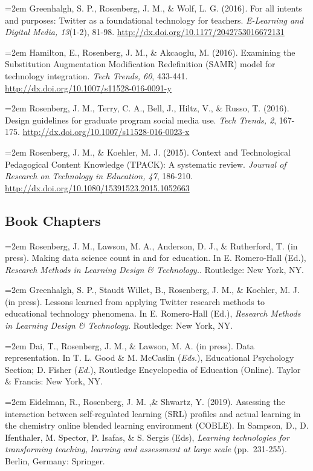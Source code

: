 \documentclass[
  11pt,
]{article}
\begin{document}
\hangindent=2em Greenhalgh, S. P., Rosenberg, J. M., \& Wolf, L. G.
(2016). For all intents and purposes: Twitter as a foundational
technology for teachers. \emph{E-Learning and Digital Media, 13}(1-2),
81-98. \url{http://dx.doi.org/10.1177/2042753016672131}

\hangindent=2em Hamilton, E., Rosenberg, J. M., \& Akcaoglu, M. (2016).
Examining the Substitution Augmentation Modification Redefinition (SAMR)
model for technology integration. \emph{Tech Trends, 60}, 433-441.
\url{http://dx.doi.org/10.1007/s11528-016-0091-y}

\hangindent=2em Rosenberg, J. M., Terry, C. A., Bell, J., Hiltz, V., \&
Russo, T. (2016). Design guidelines for graduate program social media
use. \emph{Tech Trends, 2}, 167-175.
\url{http://dx.doi.org/10.1007/s11528-016-0023-x}

\hangindent=2em Rosenberg, J. M., \& Koehler, M. J. (2015). Context and
Technological Pedagogical Content Knowledge (TPACK): A systematic
review. \emph{Journal of Research on Technology in Education, 47},
186-210. \url{http://dx.doi.org/10.1080/15391523.2015.1052663}

\hypertarget{book-chapters}{%
\subsection{Book Chapters}\label{book-chapters}}

\hangindent=2em Rosenberg, J. M., Lawson, M. A., Anderson, D. J., \&
Rutherford, T. (in press). Making data science count in and for
education. In E. Romero-Hall (Ed.), \emph{Research Methods in Learning
Design \& Technology.}. Routledge: New York, NY.

\hangindent=2em Greenhalgh, S. P., Staudt Willet, B., Rosenberg, J. M.,
\& Koehler, M. J. (in press). Lessons learned from applying Twitter
research methods to educational technology phenomena. In E. Romero-Hall
(Ed.), \emph{Research Methods in Learning Design \& Technology}.
Routledge: New York, NY.

\hangindent=2em Dai, T., Rosenberg, J. M., \& Lawson, M. A. (in press).
Data representation. In T. L. Good \& M. McCaslin (\emph{Eds.}),
Educational Psychology Section; D. Fisher (\emph{Ed.}), Routledge
Encyclopedia of Education (Online). Taylor \& Francis: New York, NY.

\hangindent=2em Eidelman, R., Rosenberg, J. M. ,\& Shwartz, Y. (2019).
Assessing the interaction between self-regulated learning (SRL) profiles
and actual learning in the chemistry online blended learning environment
(COBLE). In Sampson, D., D. Ifenthaler, M. Spector, P. Isafas, \& S.
Sergis (Eds), \emph{Learning technologies for transforming teaching,
learning and assessment at large scale} (pp.~231-255). Berlin, Germany:
Springer.
\end{document}
